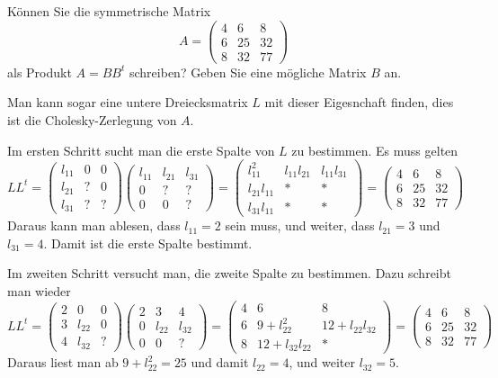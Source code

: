 Können Sie die symmetrische Matrix
\[
A=\begin{pmatrix}
 4& 6& 8\\
 6&25&32\\
 8&32&77
\end{pmatrix}
\]
als Produkt $A=BB^t$ schreiben? Geben Sie eine mögliche Matrix $B$ an.


\begin{loesung}
Man kann sogar eine untere Dreiecksmatrix $L$ mit dieser Eigesnchaft finden,
dies ist die Cholesky-Zerlegung von $A$.

Im ersten Schritt sucht man die erste Spalte von $L$ zu bestimmen.
Es muss gelten
\[
LL^t=
\begin{pmatrix}
l_{11}&  0&  0\\
l_{21}&  ?&  0\\
l_{31}&  ?&  ?
\end{pmatrix}
\begin{pmatrix}
l_{11}&l_{21}&l_{31}\\
     0&     ?&     ?\\
     0&     0&     ?
\end{pmatrix}
=
\begin{pmatrix}
    l_{11}^2&l_{11}l_{21}&l_{11}l_{31}\\
l_{21}l_{11}&           *&           *\\
l_{31}l_{11}&           *&           *
\end{pmatrix}
=
\begin{pmatrix}
 4& 6& 8\\
 6&25&32\\
 8&32&77
\end{pmatrix}
\]
Daraus kann man ablesen, dass $l_{11}=2$ sein muss, und weiter,
dass
$l_{21}=3$ und $l_{31}=4$. Damit ist die erste Spalte bestimmt.

Im zweiten Schritt versucht man, die zweite Spalte zu bestimmen.
Dazu schreibt man wieder
\[
LL^t
=
\begin{pmatrix}
2&     0&0\\
3&l_{22}&0\\
4&l_{32}&?
\end{pmatrix}
\begin{pmatrix}
2&     3&     4\\
0&l_{22}&l_{32}\\
0&     0&?
\end{pmatrix}
=
\begin{pmatrix}
 4&              6&             8\\
 6& 9+l_{22}^2    &12+l_{22}l_{32}\\
 8&12+l_{32}l_{22}&             *
\end{pmatrix}
=
\begin{pmatrix}
 4& 6& 8\\
 6&25&32\\
 8&32&77
\end{pmatrix}
\]
Daraus liest man ab $9+l_{22}^2=25$ und damit $l_{22}=4$, und weiter
$l_{32}=5$.


\end{loesung}
